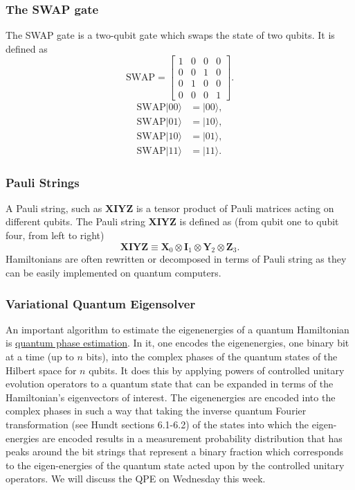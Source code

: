 \documentclass{beamer}
\begin{document}
\begin{frame}
\frametitle{The SWAP gate}

The SWAP gate is a two-qubit gate which swaps the state of two qubits. It is defined as
\[
	\text{SWAP} = \begin{bmatrix}
		1 & 0 & 0 & 0 \\
		0 & 0 & 1 & 0 \\
		0 & 1 & 0 & 0 \\
		0 & 0 & 0 & 1
	\end{bmatrix}.
\]
\begin{align*}
	\text{SWAP}\vert 00\rangle &= \vert 00\rangle, \\
	\text{SWAP} \vert 01\rangle &= \vert 10\rangle, \\
	\text{SWAP} \vert 10\rangle &= \vert 01\rangle, \\
	\text{SWAP} \vert 11\rangle &= \vert 11 \rangle.
\end{align*}
\end{frame}

\begin{frame}
\frametitle{Pauli Strings}

A Pauli string, such as $\bm{XIYZ}$ is a tensor product of Pauli matrices acting on different qubits.
The Pauli string $\bm{XIYZ}$ is defined as (from qubit one to qubit four, from left to right)
\[
	\bm{XIYZ} \equiv \bm{X}_0 \otimes \bm{I}_1 \otimes \bm{Y}_2 \otimes \bm{Z}_3.
\]
Hamiltonians are often rewritten or decomposed in terms of Pauli string as they can be easily implemented on quantum computers.
\end{frame}

\begin{frame}
\frametitle{Variational Quantum Eigensolver}

An important  algorithm to estimate the eigenenergies of a quantum
Hamiltonian is \href{{https://qiskit.org/textbook/ch-algorithms/quantum-phase-estimation.html}}{quantum phase
estimation}. In
it, one encodes the eigenenergies, one binary bit at a time (up to $n$
bits), into the complex phases of the quantum states of the Hilbert
space for $n$ qubits. It does this by applying powers of controlled
unitary evolution operators to a quantum state that can be expanded in
terms of the Hamiltonian's eigenvectors of interest. The eigenenergies
are encoded into the complex phases in such a way that taking the
inverse quantum Fourier transformation (see Hundt sections 6.1-6.2) of
the states into which the eigen-energies are encoded results in a
measurement probability distribution that has peaks around the bit
strings that represent a binary fraction which corresponds to the
eigen-energies of the quantum state acted upon by the controlled
unitary operators. We will discuss the QPE on Wednesday this week.
\end{frame}
\end{document}
